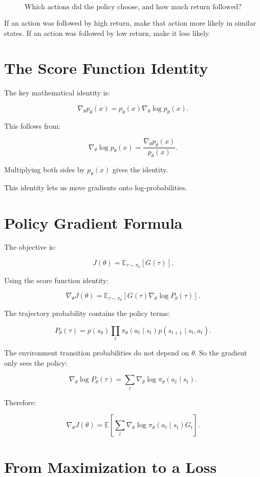 \documentclass[11pt]{article}
\begin{document}
\[
\text{Which actions did the policy choose, and how much return followed?}
\]

If an action was followed by high return, make that action more likely in similar states.
If an action was followed by low return, make it less likely.

\section{The Score Function Identity}

The key mathematical identity is:

\[
\nabla_\theta p_\theta(x)
=
p_\theta(x)\nabla_\theta \log p_\theta(x).
\]

This follows from:

\[
\nabla_\theta \log p_\theta(x)
=
\frac{\nabla_\theta p_\theta(x)}{p_\theta(x)}.
\]

Multiplying both sides by $p_\theta(x)$ gives the identity.

This identity lets us move gradients onto log-probabilities.

\section{Policy Gradient Formula}

The objective is:

\[
J(\theta)
=
\mathbb{E}_{\tau \sim \pi_\theta}[G(\tau)].
\]

Using the score function identity:

\[
\nabla_\theta J(\theta)
=
\mathbb{E}_{\tau \sim \pi_\theta}
\left[
G(\tau)\nabla_\theta \log P_\theta(\tau)
\right].
\]

The trajectory probability contains the policy terms:

\[
P_\theta(\tau)
=
p(s_0)
\prod_t
\pi_\theta(a_t \mid s_t)
p(s_{t+1} \mid s_t,a_t).
\]

The environment transition probabilities do not depend on $\theta$.
So the gradient only sees the policy:

\[
\nabla_\theta \log P_\theta(\tau)
=
\sum_t \nabla_\theta \log \pi_\theta(a_t \mid s_t).
\]

Therefore:

\[
\boxed{
\nabla_\theta J(\theta)
=
\mathbb{E}
\left[
\sum_t \nabla_\theta \log \pi_\theta(a_t \mid s_t)G_t
\right].
}
\]

\section{From Maximization to a Loss}
\end{document}
